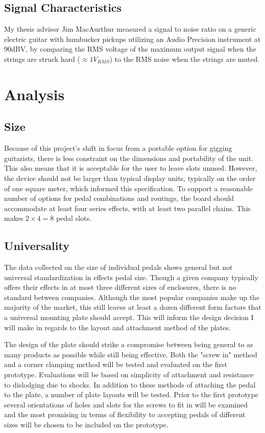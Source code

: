 \documentclass{article}
\begin{document}
	\subsection{Signal Characteristics}
	My thesis advisor Jim MacAurthur measured a signal to noise ratio on a generic electric guitar with humbucker pickups utilizing an Audio Precision instrument at 90dBV, by comparing the RMS voltage of the maximum output signal when the strings are struck hard ($\approx 1V_{RMS}$) to the RMS noise when the strings are muted.



\section{Analysis}

	\subsection{Size}
	Because of this project's shift in focus from a portable option for gigging guitarists, there is less constraint on the dimensions and portability of the unit.  This also means that it is acceptable for the user to leave slots unused.  However, the device should not be larger than typical display units, typically on the order of one square meter, which informed this specification.  To support a reasonable number of options for pedal combinations and routings, the board should accommodate at least four series effects, with at least two parallel chains.  This makes $2 \times 4 = 8$ pedal slots.

	\subsection{Universality}

	The data collected on the size of individual pedals shows general but not universal standardization in effects pedal size.  Though a given company typically offers their effects in at most three different sizes of enclosures, there is no standard between companies.  Although the most popular companies make up the majority of the market, this still leaves at least a dozen different form factors that a universal mounting plate should accept.  This will inform the design decision I will make in regards to the layout and attachment method of the plates.

	The design of the plate should strike a compromise between being general to as many products as possible while still being effective.  Both the "screw in" method \cite{ABBATE:2016} and a corner clamping method will be tested and evaluated on the first prototype.  Evaluations will be based on simplicity of attachment and resistance to dislodging due to shocks.  In addition to these methods of attaching the pedal to the plate, a number of plate layouts will be tested.  Prior to the first prototype several orientations of holes and slots for the screws to fit in will be examined and the most promising in terms of flexibility to accepting pedals of different sizes will be chosen to be included on the prototype.
\end{document}
